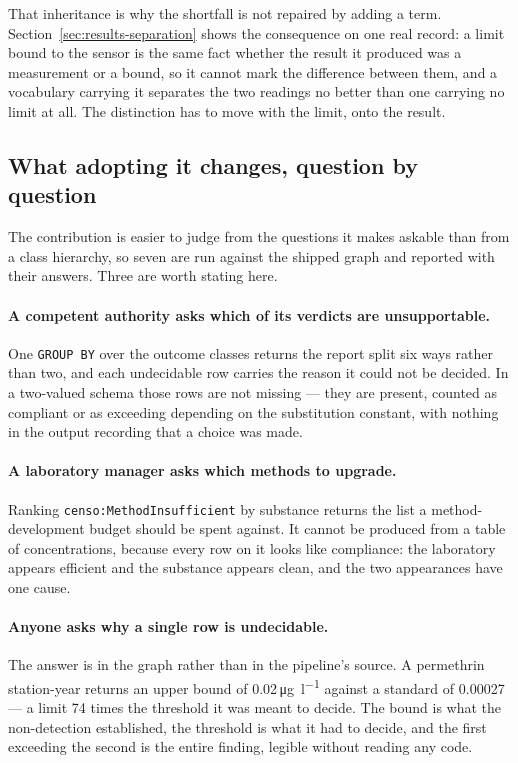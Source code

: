 That inheritance is why the shortfall is not repaired by adding a term.
Section~\ref{sec:results-separation} shows the consequence on one real record:
a limit bound to the sensor is the same fact whether the result it produced was
a measurement or a bound, so it cannot mark the difference between them, and a
vocabulary carrying it separates the two readings no better than one carrying
no limit at all. The distinction has to move with the limit, onto the result.

\subsection{What adopting it changes, question by question}
\label{sec:disc-usecases}
The contribution is easier to judge from the questions it makes askable than
from a class hierarchy, so seven are run against the shipped graph and reported
with their answers. Three are worth stating here.

\paragraph{A competent authority asks which of its verdicts are unsupportable.}
One \texttt{GROUP BY} over the outcome classes returns the report split six
ways rather than two, and each undecidable row carries the reason it could not
be decided. In a two-valued schema those rows are not missing --- they are
present, counted as compliant or as exceeding depending on the substitution
constant, with nothing in the output recording that a choice was made.

\paragraph{A laboratory manager asks which methods to upgrade.}
Ranking \texttt{censo:MethodInsufficient} by substance returns the list a
method-development budget should be spent against. It cannot be produced from a
table of concentrations, because every row on it looks like compliance: the
laboratory appears efficient and the substance appears clean, and the two
appearances have one cause.

\paragraph{Anyone asks why a single row is undecidable.}
The answer is in the graph rather than in the pipeline's source. A permethrin
station-year returns an upper bound of \num{0.02}\,\si{\micro\gram\per\litre}
against a standard of \num{0.00027} --- a limit \num{74} times the threshold it
was meant to decide. The bound is what the non-detection established, the
threshold is what it had to decide, and the first exceeding the second is the
entire finding, legible without reading any code.

